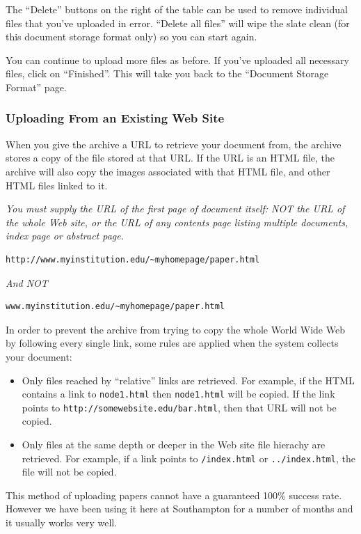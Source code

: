 The ``Delete'' buttons on the right of the table can be used to remove individual files that you've uploaded in error. ``Delete all files'' will wipe the slate clean (for this document storage format only) so you can start again.

You can continue to upload more files as before. If you've uploaded all necessary files, click on ``Finished''. This will take you back to the ``Document Storage Format'' page.


\subsubsection{Uploading From an Existing Web Site}

When you give the archive a URL to retrieve your document from, the archive stores a copy of the file stored at that URL. If the URL is an HTML file, the archive will also copy the images associated with that HTML file, and other HTML files linked to it.

\emph{You must supply the URL of the first page of document itself: NOT the URL of the whole Web site, or the URL of any contents page listing multiple documents, index page or abstract page.}

\begin{verbatim}
http://www.myinstitution.edu/~myhomepage/paper.html
\end{verbatim}

\emph{And NOT}
\begin{verbatim}
www.myinstitution.edu/~myhomepage/paper.html
\end{verbatim}

In order to prevent the archive from trying to copy the whole World Wide Web by following every single link, some rules are applied when the system collects your document:

\begin{itemize}
\item Only files reached by ``relative'' links are retrieved. For example, if the HTML contains a link to {\tt node1.html} then {\tt node1.html} will be copied. If the link points to {\tt http://somewebsite.edu/bar.html}, then that URL will not be copied.
\item Only files at the same depth or deeper in the Web site file hierachy are retrieved. For example, if a link points to {\tt /index.html} or {\tt ../index.html}, the file will not be copied.
\end{itemize}

This method of uploading papers cannot have a guaranteed 100\% success rate. However we have been using it here at Southampton for a number of months and it usually works very well.

